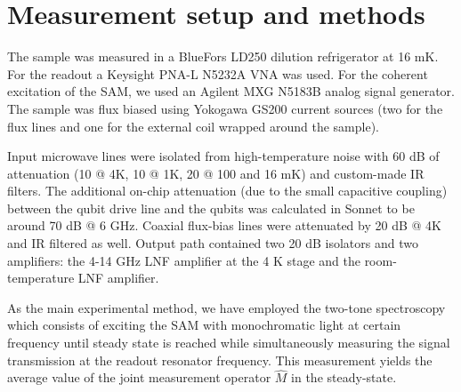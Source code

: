 \documentclass[%
 pra,
 amsmath,amssymb,
 reprint,%
]{revtex4-1}
\begin{document}
\section{Measurement setup and methods}\label{sec:meas_setup}
The sample was measured in a BlueFors LD250 dilution refrigerator at 16 mK. For the readout a Keysight PNA-L N5232A VNA was used. For the coherent excitation of the SAM, we used an Agilent MXG N5183B analog signal generator. The sample was 
flux biased using Yokogawa GS200 current sources (two for the flux lines and one for the external coil wrapped around the sample).

Input microwave lines were isolated from high-temperature noise with 60 dB of attenuation (10 @ 4K, 10 @ 1K, 20 @ 100 and 16 mK) and custom-made IR filters. The additional on-chip attenuation (due to the small capacitive coupling) between the qubit drive line and the qubits was calculated in Sonnet to be around 70 dB @ 6 GHz. Coaxial flux-bias lines were attenuated by 20 dB @ 4K and IR filtered as well. Output path contained two 20 dB isolators and two amplifiers: the 4-14 GHz LNF amplifier at the 4 K stage and the room-temperature LNF amplifier.

As the main experimental method, we have employed the two-tone spectroscopy which consists of exciting the SAM with monochromatic light at certain frequency until steady state is reached while simultaneously measuring the signal transmission at the readout resonator frequency. This measurement yields the average value of the joint measurement operator $\hat M$ in the steady-state.



\end{document}
